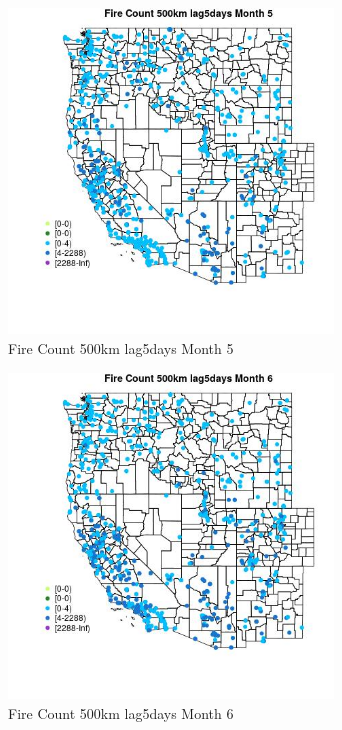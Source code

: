 \begin{figure} 
\centering  
\includegraphics[width=0.77\textwidth]{Code_Outputs/Report_ML_input_PM25_Step4_part_e_de_duplicated_aves_compiled_2019-05-21wNAs_MapObsMo5Fire_Count_500km_lag5days.jpg} 
\caption{\label{fig:Report_ML_input_PM25_Step4_part_e_de_duplicated_aves_compiled_2019-05-21wNAsMapObsMo5Fire_Count_500km_lag5days}Fire Count 500km lag5days Month 5} 
\end{figure} 
 

\begin{figure} 
\centering  
\includegraphics[width=0.77\textwidth]{Code_Outputs/Report_ML_input_PM25_Step4_part_e_de_duplicated_aves_compiled_2019-05-21wNAs_MapObsMo6Fire_Count_500km_lag5days.jpg} 
\caption{\label{fig:Report_ML_input_PM25_Step4_part_e_de_duplicated_aves_compiled_2019-05-21wNAsMapObsMo6Fire_Count_500km_lag5days}Fire Count 500km lag5days Month 6} 
\end{figure} 
 

